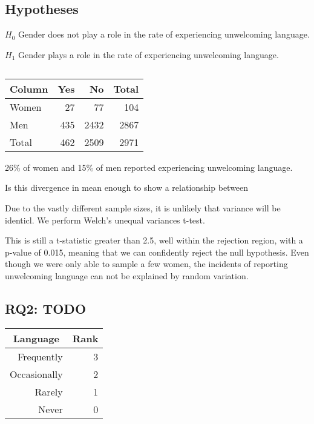 \documentclass[journal,12pt,onecolumn,]{IEEEtran}
\begin{document}
\subsection{Hypotheses}

$H_0$ Gender does not play a role in the rate of experiencing unwelcoming language.

$H_1$ Gender plays a role in the rate of experiencing unwelcoming language.
\subsection{}

\begin{tabular}{lrrr}
    \toprule
    Column & Yes & No   & Total \\
    \midrule
    Women  & 27  & 77   & 104   \\
    Men    & 435 & 2432 & 2867  \\
    Total  & 462 & 2509 & 2971  \\
    \bottomrule
\end{tabular}

26\% of women and 15\% of men reported experiencing unwelcoming language.

Is this divergence in mean enough to show a relationship between

Due to the vastly different sample sizes, it is unlikely that variance will be identicl.
We perform Welch's unequal variances t-test.

This is still a t-statistic greater than 2.5, well within the rejection region, with a p-value of 0.015, meaning that we can confidently reject the null hypothesis.
Even though we were only able to sample a few women, the incidents of reporting unwelcoming language can not be explained by random variation.

\begin{figure}
    \centering
    
\end{figure}


\subsection{RQ2: TODO}

\begin{table}[]
    \begin{tabular}{|r|r|}
        \hline
        \multicolumn{1}{|c|}{\textbf{Language}} & \multicolumn{1}{c|}{\textbf{Rank}} \\ \hline
        Frequently                              & 3                                  \\ \hline
        Occasionally                            & 2                                  \\ \hline
        Rarely                                  & 1                                  \\ \hline
        Never                                   & 0                                  \\ \hline
    \end{tabular}
\end{table}
\end{document}
